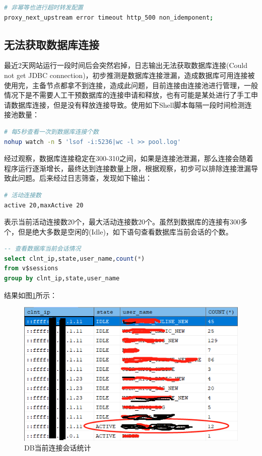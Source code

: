 \documentclass{book}
\begin{document}
\begin{lstlisting}[language=Bash]
# 非幂等也进行超时转发配置
proxy_next_upstream error timeout http_500 non_idemponent;
\end{lstlisting}

\subsection{无法获取数据库连接}

最近2天网站运行一段时间后会突然宕掉，日志输出无法获取数据库连接(Could not get JDBC connection)，初步推测是数据库连接泄漏，造成数据库可用连接被使用完，主备节点都拿不到连接，造成此问题，目前连接由连接池进行管理，一般情况下是不需要人工干预数据库的连接申请和释放，也有可能是某处进行了手工申请数据库连接，但是没有释放连接导致。使用如下Shell脚本每隔一段时间检测连接池数量：

\begin{lstlisting}[language=Bash]
# 每5秒查看一次到数据库连接个数
nohup watch -n 5 'lsof -i:5236|wc -l >> pool.log'
\end{lstlisting}

经过观察，数据库连接稳定在300-310之间，如果是连接池泄漏，那么连接会随着程序运行逐渐增长，最终达到连接数量上限，根据观察，初步可以排除连接泄漏导致此问题。后来经过日志筛查，发现如下输出：

\begin{lstlisting}[language=Bash]
# 活动连接数
active 20,maxActive 20
\end{lstlisting}

表示当前活动连接数20个，最大活动连接数20个。虽然到数据库的连接有300多个，但是绝大多数是空闲的(Idle)，如下语句查看数据库当前会话的个数。

\begin{lstlisting}[language=SQL]
-- 查看数据库当前会话情况
select clnt_ip,state,user_name,count(*)
from v$sessions
group by clnt_ip,state,user_name
\end{lstlisting}

结果如图\ref{fig:sessionstatistics}所示：

\begin{figure}[htbp]
	\centering
	\includegraphics[scale=0.8]{sessionstatistics.png}
	\caption{DB当前连接会话统计}
	\label{fig:sessionstatistics}
\end{figure}
\end{document}
